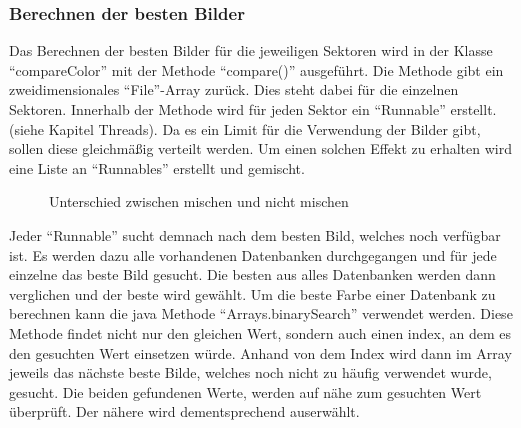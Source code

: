 \newpage

\subsubsection{Berechnen der besten Bilder}
Das Berechnen der besten Bilder für die jeweiligen Sektoren wird in der Klasse ``compareColor'' mit der Methode ``compare()'' ausgeführt. Die Methode gibt ein zweidimensionales ``File''-Array zurück. Dies steht dabei für die einzelnen Sektoren. Innerhalb der Methode wird für jeden Sektor ein ``Runnable'' erstellt. (siehe Kapitel Threads). Da es ein Limit für die Verwendung der Bilder gibt, sollen diese gleichmäßig verteilt werden. Um einen solchen Effekt zu erhalten wird eine Liste an ``Runnables'' erstellt und gemischt.

\begin{figure}[h]
    \centering
    \caption[Beste Bilder]{Unterschied zwischen mischen und nicht mischen}
\end{figure}

\begin{sloppypar}
Jeder ``Runnable'' sucht demnach nach dem besten Bild, welches noch verfügbar ist. Es werden dazu alle vorhandenen Datenbanken durchgegangen und für jede einzelne das beste Bild gesucht. Die besten aus alles Datenbanken werden dann verglichen und der beste wird gewählt. Um die beste Farbe einer Datenbank zu berechnen kann die java Methode ``Arrays.binarySearch'' verwendet werden. Diese Methode findet nicht nur den gleichen Wert, sondern auch einen index, an dem es den gesuchten Wert einsetzen würde. Anhand von dem Index wird dann im Array jeweils das nächste beste Bilde, welches noch nicht zu häufig verwendet wurde, gesucht. Die beiden gefundenen Werte, werden auf nähe zum gesuchten Wert überprüft. Der nähere wird dementsprechend auserwählt.
\end{sloppypar}


